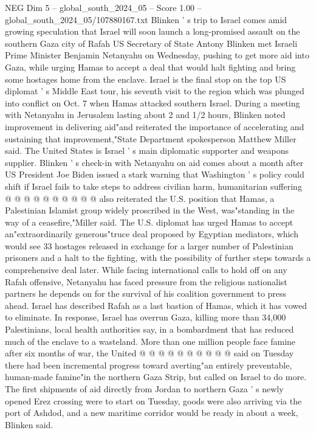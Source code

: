 \begin{textsample}{NEG Dim 5 – global\_south\_2024\_05 – Score 1.00 – global\_south\_2024\_05/107880167.txt}  \label{ex:f5_neg_328}
Blinken ' s trip to Israel comes amid growing speculation that Israel will soon launch a long-promised assault on the southern Gaza city of Rafah US Secretary of State Antony Blinken met Israeli Prime Minister Benjamin Netanyahu on Wednesday, pushing to get more aid into Gaza, while urging Hamas to accept a deal that would halt fighting and bring some hostages home from the enclave.
Israel is the final stop on the top US diplomat ' s Middle East tour, his seventh visit to the region which was plunged into conflict on Oct. 7 when Hamas attacked southern Israel.
During a meeting with Netanyahu in Jerusalem lasting about 2 and 1/2 hours, Blinken noted improvement in delivering aid"and reiterated the importance of accelerating and sustaining that improvement,"State Department spokesperson Matthew Miller said.
The United States is Israel ' s main diplomatic supporter and weapons supplier.
Blinken ' s check-in with Netanyahu on aid comes about a month after US President Joe Biden issued a stark warning that Washington ' s policy could shift if Israel fails to take steps to address civilian harm, humanitarian suffering @ @ @ @ @ @ @ @ @ @ also reiterated the U.S. position that Hamas, a Palestinian Islamist group widely proscribed in the West, was"standing in the way of a ceasefire,"Miller said.
The U.S. diplomat has urged Hamas to accept an"extraordinarily generous"truce deal proposed by Egyptian mediators, which would see 33 hostages released in exchange for a larger number of Palestinian prisoners and a halt to the fighting, with the possibility of further steps towards a comprehensive deal later.
While facing international calls to hold off on any Rafah offensive, Netanyahu has faced pressure from the religious nationalist partners he depends on for the survival of his coalition government to press ahead.
Israel has described Rafah as a last bastion of Hamas, which it has vowed to eliminate.
In response, Israel has overrun Gaza, killing more than 34,000 Palestinians, local health authorities say, in a bombardment that has reduced much of the enclave to a wasteland.
More than one million people face famine after six months of war, the United @ @ @ @ @ @ @ @ @ @ said on Tuesday there had been incremental progress toward averting"an entirely preventable, human-made famine"in the northern Gaza Strip, but called on Israel to do more.
The first shipments of aid directly from Jordan to northern Gaza ' s newly opened Erez crossing were to start on Tuesday, goods were also arriving via the port of Ashdod, and a new maritime corridor would be ready in about a week, Blinken said.

\end{textsample}
